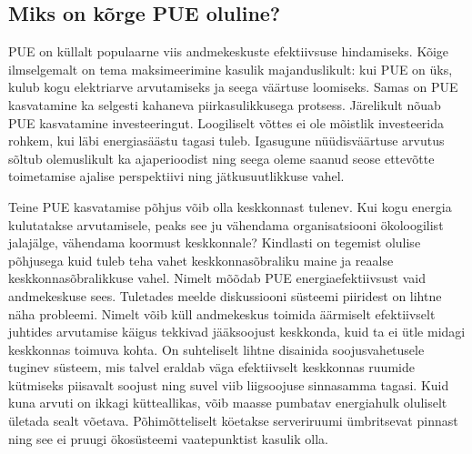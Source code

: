 \documentclass{tufte-book}
\begin{document}
\subsection{Miks on kõrge PUE oluline?}
PUE on küllalt populaarne viis andmekeskuste efektiivsuse hindamiseks. Kõige ilmselgemalt on tema maksimeerimine kasulik majanduslikult: kui PUE on üks, kulub kogu elektriarve arvutamiseks ja seega väärtuse loomiseks. Samas on PUE kasvatamine ka selgesti kahaneva piirkasulikkusega protsess. Järelikult nõuab PUE kasvatamine investeeringut. Loogiliselt võttes ei ole mõistlik investeerida rohkem, kui läbi energiasäästu tagasi tuleb. Igasugune nüüdisväärtuse arvutus sõltub olemuslikult ka ajaperioodist ning seega oleme saanud seose ettevõtte toimetamise ajalise perspektiivi ning jätkusuutlikkuse vahel. 

Teine PUE kasvatamise põhjus võib olla keskkonnast tulenev. Kui kogu energia kulutatakse arvutamisele, peaks see ju vähendama organisatsiooni ökoloogilist jalajälge, vähendama koormust keskkonnale? Kindlasti on tegemist olulise põhjusega kuid tuleb teha vahet keskkonnasõbraliku maine ja reaalse keskkonnasõbralikkuse vahel. Nimelt mõõdab PUE energiaefektiivsust vaid andmekeskuse sees. Tuletades meelde diskussiooni süsteemi piiridest on lihtne näha probleemi. Nimelt võib küll andmekeskus toimida äärmiselt efektiivselt juhtides arvutamise käigus tekkivad jääksoojust keskkonda, kuid ta ei ütle midagi keskkonnas toimuva kohta. On suhteliselt lihtne disainida soojusvahetusele tuginev süsteem, mis talvel eraldab väga efektiivselt keskkonnas ruumide kütmiseks piisavalt soojust ning suvel viib liigsoojuse sinnasamma tagasi. Kuid kuna arvuti on ikkagi kütteallikas, võib maasse pumbatav energiahulk oluliselt ületada sealt võetava. Põhimõtteliselt köetakse serveriruumi ümbritsevat pinnast ning see ei pruugi ökosüsteemi vaatepunktist kasulik olla. 
\end{document}
